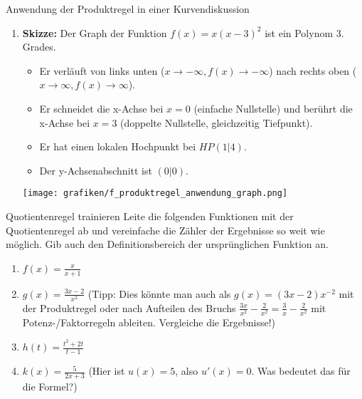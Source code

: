 \begin{loesungsumgebung}{Anwendung der Produktregel in einer Kurvendiskussion}
\begin{enumerate}[label=(\alph*)]
    \item \textbf{Skizze:}
    Der Graph der Funktion $f(x) = x(x-3)^2$ ist ein Polynom 3. Grades.
    \begin{itemize}
        \item Er verläuft von links unten ($x \to -\infty, f(x) \to -\infty$) nach rechts oben ($x \to \infty, f(x) \to \infty$).
        \item Er schneidet die x-Achse bei $x=0$ (einfache Nullstelle) und berührt die x-Achse bei $x=3$ (doppelte Nullstelle, gleichzeitig Tiefpunkt).
        \item Er hat einen lokalen Hochpunkt bei $HP(1|4)$.
        \item Der y-Achsenabschnitt ist $(0|0)$.
    \end{itemize}
    \begin{center}
    \texttt{[image: grafiken/f\_produktregel\_anwendung\_graph.png]}
    \label{fig:f_produktregel_anwendung_graph}
    \end{center}
\end{enumerate}

\end{loesungsumgebung}


\begin{aufgabenumgebung}{Quotientenregel trainieren}
Leite die folgenden Funktionen mit der Quotientenregel ab und vereinfache die Zähler der Ergebnisse so weit wie möglich. Gib auch den Definitionsbereich der ursprünglichen Funktion an.
\begin{enumerate}
    \item $f(x) = \frac{x}{x+1}$
    \item $g(x) = \frac{3x-2}{x^2}$ (Tipp: Dies könnte man auch als $g(x) = (3x-2)x^{-2}$ mit der Produktregel oder nach Aufteilen des Bruchs $\frac{3x}{x^2} - \frac{2}{x^2} = \frac{3}{x} - \frac{2}{x^2}$ mit Potenz-/Faktorregeln ableiten. Vergleiche die Ergebnisse!)
    \item $h(t) = \frac{t^2+2t}{t-1}$
    \item $k(x) = \frac{5}{2x+3}$ (Hier ist $u(x)=5$, also $u'(x)=0$. Was bedeutet das für die Formel?)
\end{enumerate}
\end{aufgabenumgebung}



